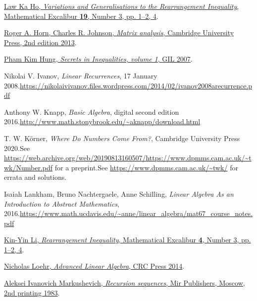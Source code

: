 \documentclass[numbers=enddot,12pt,final,onecolumn,notitlepage]{scrartcl}%
\numberwithin{exer}{subsection}
\theoremstyle{definition}
\begin{document}
\begin{thebibliography}{99999999}
%
\href{https://www.math.hkust.edu.hk/excalibur/v19_n3.pdf}{Law Ka Ho,
\textit{Variations and Generalisations to the Rearrangement Inequality},
Mathematical Excalibur \textbf{19}, Number 3, pp. 1--2, 4}.

%
\href{http://www.cse.zju.edu.cn/eclass/attachments/2015-10/01-1446086008-145421.pdf}{Roger
A. Horn, Charles R. Johnson, \textit{Matrix analysis}, Cambridge University
Press, 2nd edition 2013}.

%
\href{http://refkol.ro/matek/mathbooks/!Books!/Secrets in Inequalities (volume 1) Pham Kim Hung.pdf}{Pham
Kim Hung, \textit{Secrets in Inequalities, volume 1}, GIL 2007}.

Nikolai V. Ivanov, \textit{Linear Recurrences}, 17
January 2008.\newline\url{https://nikolaivivanov.files.wordpress.com/2014/02/ivanov2008arecurrence.pdf}

Anthony W. Knapp, \textit{Basic Algebra}, digital
second edition 2016.\newline\url{http://www.math.stonybrook.edu/~aknapp/download.html}

T. W. K\"{o}rner, \textit{Where Do Numbers Come
From?}, Cambridge University Press 2020.\newline See
\url{https://web.archive.org/web/20190813160507/https://www.dpmms.cam.ac.uk/~twk/Number.pdf}
for a preprint.\newline See \url{https://www.dpmms.cam.ac.uk/~twk/} for errata
and solutions.

Isaiah Lankham, Bruno Nachtergaele, Anne
Schilling, \textit{Linear Algebra As an Introduction to Abstract Mathematics},
2016.\newline\url{https://www.math.ucdavis.edu/~anne/linear_algebra/mat67_course_notes.pdf}

%
\href{https://www.math.hkust.edu.hk/excalibur/v4_n3.pdf}{Kin-Yin Li,
\textit{Rearrangement Inequality}, Mathematical Excalibur \textbf{4}, Number
3, pp. 1--2, 4}.

%
\href{https://elblogdecontar.files.wordpress.com/2017/01/ebookdaraz-advanced-linear-algebra.pdf}{Nicholas
Loehr, \textit{Advanced Linear Algebra}, CRC Press 2014}.

%
\href{https://archive.org/details/recursion-sequences}{Aleksei Ivanovich
Markushevich, \textit{Recursion sequences}, Mir Publishers, Moscow, 2nd
printing 1983}.


\end{thebibliography}
\end{document}
